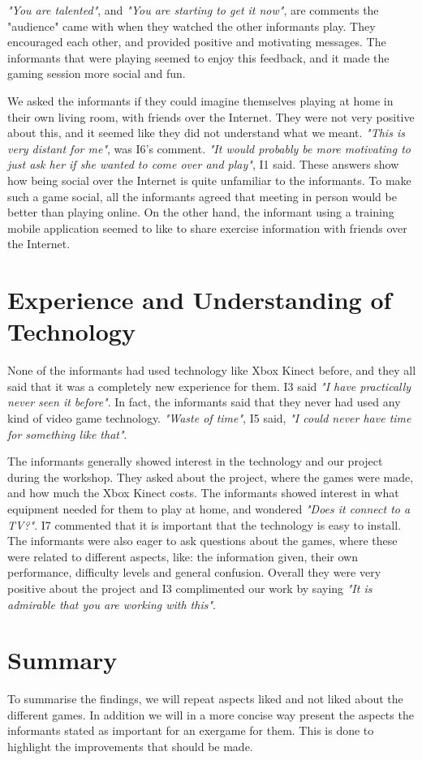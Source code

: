 \emph{"You are talented"}, and \emph{"You are starting to get it now"}, are comments the "audience" came with when they watched the other informants play. They encouraged each other, and provided positive and motivating messages. The informants that were playing seemed to enjoy this feedback, and it made the gaming session more social and fun.  

We asked the informants if they could imagine themselves playing at home in their own living room, with friends over the Internet. They were not very positive about this, and it seemed like they did not understand what we meant. \emph{"This is very distant for me"}, was I6's comment. \emph{"It would probably be more motivating to just ask her if she wanted to come over and play"}, I1 said. These answers show how being social over the Internet is quite unfamiliar to the informants. To make such a game social, all the informants agreed that meeting in person would be better than playing online. On the other hand, the informant using a training mobile application seemed to like to share exercise information with friends over the Internet.

\section{Experience and Understanding of Technology}
None of the informants had used technology like Xbox Kinect before, and they all said that it was a completely new experience for them. I3 said \emph{"I have practically never seen it before"}. In fact, the informants said that they never had used any kind of video game technology. \emph{"Waste of time"}, I5 said, \emph{"I could never have time for something like that"}.  

The informants generally showed interest in the technology and our project during the workshop. They asked about the project, where the games were made, and how much the Xbox Kinect costs. The informants showed interest in what equipment needed for them to play at home, and wondered \emph{"Does it connect to a TV?"}. I7 commented that it is important that the technology is easy to install. The informants were also eager to ask questions about the games, where these were related to different aspects, like: the information given, their own performance, difficulty levels and general confusion. Overall they were very positive about the project and I3 complimented our work by saying \emph{"It is admirable that you are working with this"}. 

\section{Summary}
To summarise the findings, we will repeat aspects liked and not liked about the different games. In addition we will in a more concise way present the aspects the informants stated as important for an exergame for them. This is done to highlight the improvements that should be made.

